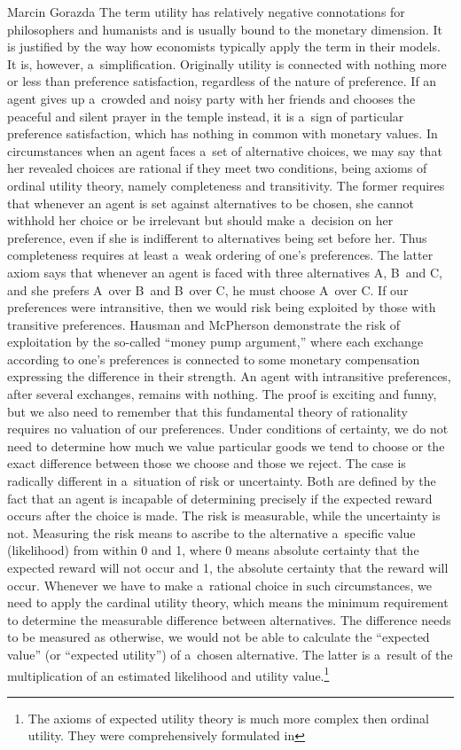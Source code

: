 \begin{artengenv}{Marcin Gorazda}
The term utility has relatively negative connotations for philosophers and humanists and is usually bound to the monetary dimension. It is justified by the way how economists typically apply the term in their models. It is, however, a~simplification. Originally utility is connected with nothing more or less than preference satisfaction, regardless of the nature of preference. If an agent gives up a~crowded and noisy party with her friends and chooses the peaceful and silent prayer in the temple instead, it is a~sign of particular preference satisfaction, which has nothing in common with monetary values. In circumstances when an agent faces a~set of alternative choices, we may say that her revealed choices are rational if they meet two conditions, being axioms of ordinal utility theory, namely completeness and transitivity. The former requires that whenever an agent is set against alternatives to be chosen, she cannot withhold her choice or be irrelevant but should make a~decision on her preference, even if she is indifferent to alternatives being set before her. Thus completeness requires at least a~weak ordering of one's preferences. The latter axiom says that whenever an agent is faced with three alternatives A, B~and C, and she prefers A~over B~and B~over C, he must choose A~over C. If our preferences were intransitive, then we would risk being exploited by those with transitive preferences. Hausman and McPherson
\parencite*[][]{hausman_economic_2006} %
 demonstrate the risk of exploitation by the so-called ``money pump argument,'' where each exchange according to one's preferences is connected to some monetary compensation expressing the difference in their strength. An agent with intransitive preferences, after several exchanges, remains with nothing. The proof is exciting and funny, but we also need to remember that this fundamental theory of rationality requires no valuation of our preferences. Under conditions of certainty, we do not need to determine how much we value particular goods we tend to choose or the exact difference between those we choose and those we reject. The case is radically different in a~situation of risk or uncertainty. Both are defined by the fact that an agent is incapable of determining precisely if the expected reward occurs after the choice is made. The risk is measurable, while the uncertainty is not. Measuring the risk means to ascribe to the alternative a~specific value (likelihood) from within 0 and 1, where 0 means absolute certainty that the expected reward will not occur and 1, the absolute certainty that the reward will occur. Whenever we have to make a~rational choice in such circumstances, we need to apply the cardinal utility theory, which means the minimum requirement to determine the measurable difference between alternatives. The difference needs to be measured as otherwise, we would not be able to calculate the ``expected value'' (or ``expected utility'') of a~chosen alternative. The latter is a~result of the multiplication of an estimated likelihood and utility value.\footnote{The axioms of expected utility theory is much more complex then ordinal utility. They were comprehensively formulated in 
}
\end{artengenv}
